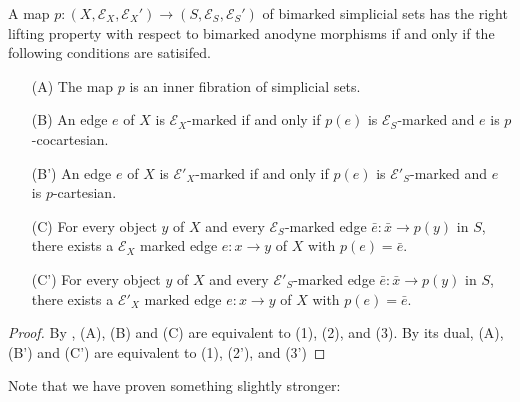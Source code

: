 \documentclass[main.tex]{subfiles}
\begin{document}
\begin{proposition}
  \label{prop:rlp_bimarked_anodyne}
  A map $p\colon (X, \mathcal{E}_{X}, \mathcal{E}_{X}') \to (S, \mathcal{E}_{S}, \mathcal{E}_{S}')$ of bimarked simplicial sets has the right lifting property with respect to bimarked anodyne morphisms if and only if the following conditions are satisifed.
  \begin{enumerate}
    \item[(A)] The map $p$ is an inner fibration of simplicial sets.

    \item[(B)] An edge $e$ of $X$ is $\mathcal{E}_{X}$-marked if and only if $p(e)$ is $\mathcal{E}_{S}$-marked and $e$ is $p$-cocartesian.

    \item[(B')] An edge $e$ of $X$ is $\mathcal{E}'_{X}$-marked if and only if $p(e)$ is $\mathcal{E}'_{S}$-marked and $e$ is $p$-cartesian.

    \item[(C)] For every object $y$ of $X$ and every $\mathcal{E}_{S}$-marked edge $\bar{e}\colon \bar{x} \to p(y)$ in $S$, there exists a $\mathcal{E}_{X}$ marked edge $e\colon x \to y$ of $X$ with $p(e) = \bar{e}$.

    \item[(C')] For every object $y$ of $X$ and every $\mathcal{E}'_{S}$-marked edge $\bar{e}\colon \bar{x} \to p(y)$ in $S$, there exists a $\mathcal{E}'_{X}$ marked edge $e\colon x \to y$ of $X$ with $p(e) = \bar{e}$.
  \end{enumerate}
\end{proposition}
\begin{proof}
  By \cite[Prop.\ 3.1.1.6]{highertopostheory}, (A), (B) and (C) are equivalent to (1), (2), and (3). By its dual, (A), (B') and (C') are equivalent to (1), (2'), and (3')
\end{proof}

Note that we have proven something slightly stronger:
\end{document}
